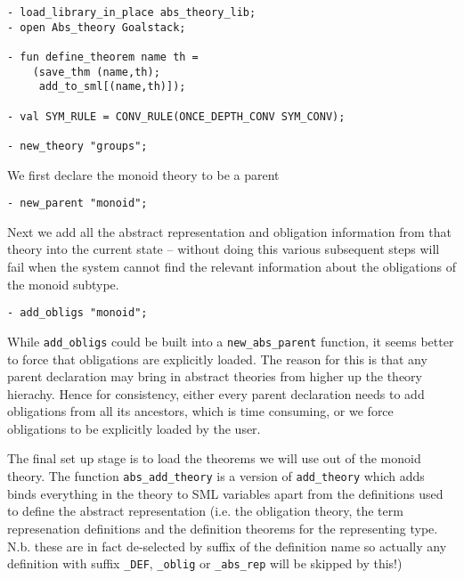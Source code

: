 \begin{small}
\begin{verbatim}
- load_library_in_place abs_theory_lib;
- open Abs_theory Goalstack;
    
- fun define_theorem name th =
    (save_thm (name,th);
     add_to_sml[(name,th)]);

- val SYM_RULE = CONV_RULE(ONCE_DEPTH_CONV SYM_CONV);

- new_theory "groups";
\end{verbatim}
\end{small}

We first declare the monoid theory to be a parent

\begin{small}
\begin{verbatim}
- new_parent "monoid";
\end{verbatim}
\end{small}

Next we add all the abstract representation and obligation information
from that theory into the current state -- without doing this
various subsequent steps will fail when the system cannot find the
relevant information about the obligations of the monoid subtype.

\begin{small}
\begin{verbatim}
- add_obligs "monoid";
\end{verbatim}
\end{small}

While \verb!add_obligs! could be built into a \verb!new_abs_parent!
function, it seems better to force that obligations are explicitly
loaded. The reason for this is that any parent declaration may bring
in abstract theories from higher up the theory hierachy. Hence for
consistency, either every parent declaration needs to add obligations
from all its ancestors, which is time consuming, or we force
obligations to be explicitly loaded by the user.

The final set up stage is to load the theorems we will use out of the
monoid theory. The function \verb!abs_add_theory! is a version of
\verb!add_theory! which adds binds everything in the theory to SML
variables apart from the definitions used to define the abstract
representation (i.e. the obligation theory, the term represenation
definitions and the definition theorems for the representing type. N.b.
these are in fact de-selected by suffix of the definition name so
actually any definition with suffix \verb!_DEF!, \verb!_oblig! or
\verb!_abs_rep! will be skipped by this!)

